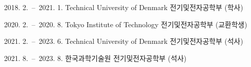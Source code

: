 \documentclass[master,english,final,pdfdoc]{kaist-ucs}
\begin{document}
	\tableofcontents

	\listoftables

	\listoffigures


	\pagestyle{kaist}
	
	
	
	
	
	
%
	\printbibliography[heading=bibintoc,title={Bibliography}]

	\acknowledgment[4]

	\curriculumvitae[4]

	\begin{personaldata}
		\address    {대전, 대한민국}
	\end{personaldata}

	\begin{education}
		\item[2018. 2.\ --\ 2021. 1.] Technical University of Denmark 전기및전자공학부 (학사)
		\item[2020. 2.\ --\ 2020. 8.] Tokyo Institute of Technology 전기및전자공학부 (교환학생)
		\item[2021. 2.\ --\ 2023. 6.] Technical University of Denmark 전기및전자공학부 (석사)
		\item[2021. 8.\ --\ 2023. 8.] 한국과학기술원 전기및전자공학부 (석사)
	\end{education}
\end{document}
